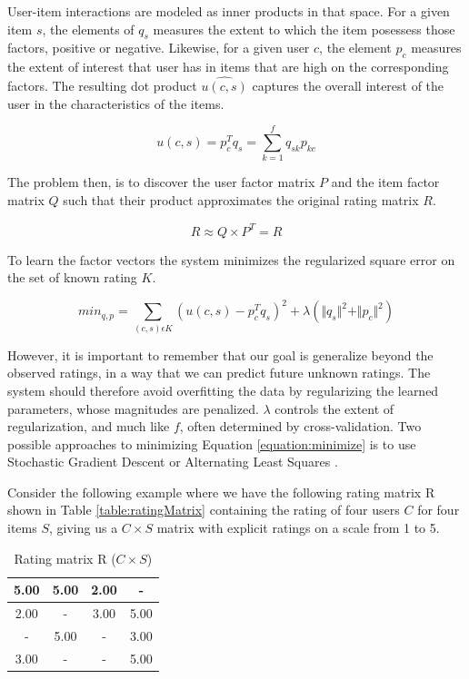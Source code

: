 User-item interactions are modeled as inner products in that space. For a given
item $s$, the elements of $q_{s}$ measures the extent to which the item
posessess those factors, positive or negative. Likewise, for a given user $c$,
the element $p_{c}$ measures the extent of interest that user has in items that
are high on the corresponding factors. The resulting dot product $\hat{u(c,s)}$
captures the overall interest of the user in the characteristics of the items.

\begin{equation}
u(c,s) = p_{c}^{T}q_{s} = \sum_{k=1}^{f} q_{sk}p_{kc}
\end{equation}

The problem then, is to discover the user factor matrix $P$ and the item factor
matrix $Q$ such that their product approximates the original rating matrix $R$.

\begin{equation}
R \approx Q \times P^{T} = \hat{R}
\end{equation}

To learn the factor vectors the system minimizes the regularized square error
on the set of known rating $K$.

\begin{equation}
\label{equation:minimize}
min_{q, p} = \sum_{(c,s)\epsilon K} (u(c,s) - p^{T}_{c}q_{s})^{2} + \lambda ( \Vert q_{s} \Vert ^{2} + \Vert p_{c} \Vert ^{2})
\end{equation}

However, it is important to remember that our goal is generalize beyond the
observed ratings, in a way that we can predict future unknown ratings. The
system should therefore avoid overfitting the data by regularizing the learned
parameters, whose magnitudes are penalized. $\lambda$ controls the extent of
regularization, and much like $f$, often determined by cross-validation. Two
possible approaches to minimizing Equation \ref{equation:minimize} is to use
Stochastic Gradient Descent or Alternating Least Squares \citep{Koren2009}.

Consider the following example where we have the following rating matrix R
shown in Table \ref{table:ratingMatrix} containing the rating of four users $C$
for four items $S$, giving us a $C \times S$ matrix with explicit ratings on a
  scale from 1 to 5.

\begin{table}[!htbp]
\centering
\begin{tabular}{|c|c|c|c|}
\hline
5.00    & 5.00  & 2.00 & -    \\ \hline
2.00    & -     & 3.00 & 5.00 \\ \hline
 -      & 5.00  & -    & 3.00 \\ \hline
3.00    & -     & -    & 5.00 \\ \hline
\end{tabular}
\label{table:RatingMatrix}
\caption{Rating matrix R ($C \times S$)}
\end{table}

